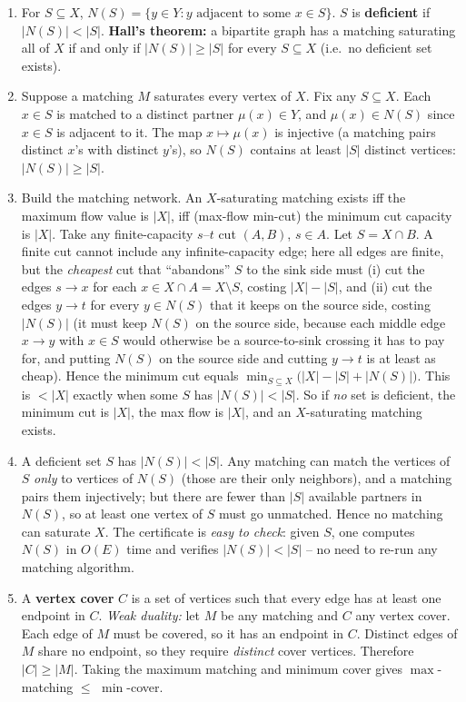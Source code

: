 \documentclass[11pt]{article}
\begin{document}
\begin{enumerate}[label=\textbf{A\arabic*.}, leftmargin=2.2em]
\item For $S \subseteq X$, $N(S) = \{y \in Y : y \text{ adjacent to some }
x \in S\}$. $S$ is \textbf{deficient} if $|N(S)| < |S|$. \textbf{Hall's theorem:}
a bipartite graph has a matching saturating all of $X$ if and only if
$|N(S)| \ge |S|$ for every $S \subseteq X$ (i.e.\ no deficient set exists).

\item Suppose a matching $M$ saturates every vertex of $X$. Fix any
$S \subseteq X$. Each $x \in S$ is matched to a distinct partner $\mu(x) \in Y$,
and $\mu(x) \in N(S)$ since $x \in S$ is adjacent to it. The map $x \mapsto
\mu(x)$ is injective (a matching pairs distinct $x$'s with distinct $y$'s), so
$N(S)$ contains at least $|S|$ distinct vertices: $|N(S)| \ge |S|$.

\item Build the matching network. An $X$-saturating matching exists iff the
maximum flow value is $|X|$, iff (max-flow min-cut) the minimum cut capacity is
$|X|$. Take any finite-capacity $s$--$t$ cut $(A,B)$, $s\in A$. Let
$S = X \cap B$. A finite cut cannot include any infinite-capacity edge; here all
edges are finite, but the \emph{cheapest} cut that ``abandons'' $S$ to the sink
side must (i) cut the edges $s \to x$ for each $x \in X \cap A = X \setminus S$,
costing $|X| - |S|$, and (ii) cut the edges $y \to t$ for every $y \in N(S)$ that
it keeps on the source side, costing $|N(S)|$ (it must keep $N(S)$ on the source
side, because each middle edge $x \to y$ with $x \in S$ would otherwise be a
source-to-sink crossing it has to pay for, and putting $N(S)$ on the source side
and cutting $y \to t$ is at least as cheap). Hence the minimum cut equals
$\min_{S \subseteq X}\big(|X| - |S| + |N(S)|\big)$. This is $< |X|$ exactly when
some $S$ has $|N(S)| < |S|$. So if \emph{no} set is deficient, the minimum cut is
$|X|$, the max flow is $|X|$, and an $X$-saturating matching exists.

\item A deficient set $S$ has $|N(S)| < |S|$. Any matching can match the vertices
of $S$ \emph{only} to vertices of $N(S)$ (those are their only neighbors), and a
matching pairs them injectively; but there are fewer than $|S|$ available
partners in $N(S)$, so at least one vertex of $S$ must go unmatched. Hence no
matching can saturate $X$. The certificate is \emph{easy to check}: given $S$,
one computes $N(S)$ in $O(E)$ time and verifies $|N(S)| < |S|$ -- no need to
re-run any matching algorithm.

\item A \textbf{vertex cover} $C$ is a set of vertices such that every edge has
at least one endpoint in $C$. \emph{Weak duality:} let $M$ be any matching and
$C$ any vertex cover. Each edge of $M$ must be covered, so it has an endpoint in
$C$. Distinct edges of $M$ share no endpoint, so they require \emph{distinct}
cover vertices. Therefore $|C| \ge |M|$. Taking the maximum matching and minimum
cover gives $\max$-matching $\le$ $\min$-cover.


\end{enumerate}
\end{document}
